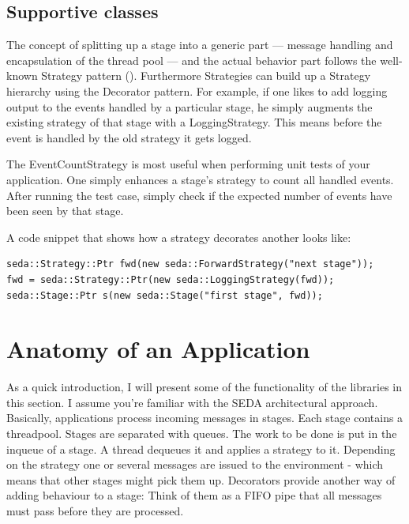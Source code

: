 \documentclass[11pt]{article}
\begin{document}
\subsection{Supportive classes}\label{sec:libseda:supportiveclasses}
The  concept of  splitting up  a  stage into  a generic  part ---  message
handling and encapsulation of the  thread pool --- and the actual behavior
part   follows   the   well-known  Strategy   pattern   (\cite{gof-book}).
Furthermore  Strategies  can  build  up  a Strategy  hierarchy  using  the
Decorator pattern. For example, if one  likes to add logging output to the
events  handled by  a particular  stage, he  simply augments  the existing
strategy of that stage with a LoggingStrategy. This means before the event
is handled by the old strategy it gets logged.

The EventCountStrategy is  most useful when performing unit  tests of your
application. One simply  enhances a stage's strategy to  count all handled
events. After running  the test case, simply check  if the expected number
of events have been seen by that stage.

A code snippet that shows how a strategy decorates another looks like:
\begin{verbatim}
seda::Strategy::Ptr fwd(new seda::ForwardStrategy("next stage"));
fwd = seda::Strategy::Ptr(new seda::LoggingStrategy(fwd));
seda::Stage::Ptr s(new seda::Stage("first stage", fwd));
\end{verbatim}


\section{Anatomy of an Application}\label{sec:anatomy of an application}
As a quick  introduction, I will present some of  the functionality of the
libraries  in  this  section.  I  assume you're  familiar  with  the  SEDA
architectural approach. Basically,  applications process incoming messages
in stages.  Each stage  contains a threadpool.  Stages are  separated with
queues. The  work to be done  is put in the  inqueue of a  stage. A thread
dequeues it and applies a strategy to it. Depending on the strategy one or
several messages  are issued to the  environment - which  means that other
stages  might pick  them  up.  Decorators provide  another  way of  adding
behaviour to a stage: Think of them  as a FIFO pipe that all messages must
pass before they are processed.
\end{document}
